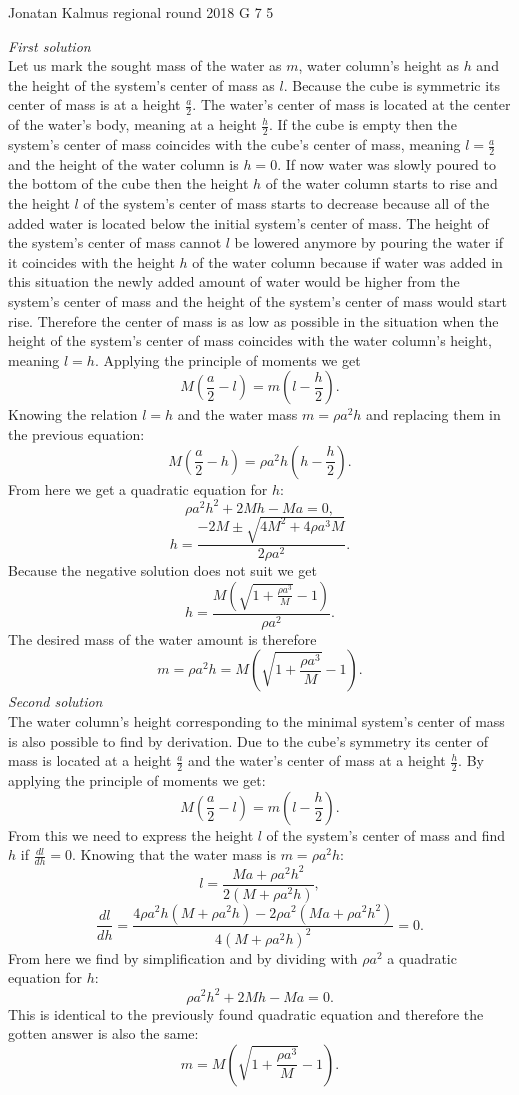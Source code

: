 \documentclass[11pt]{article}
\begin{document}
{Jonatan Kalmus} %
{regional round} %
{2018} %
{G 7} %
{5} %
{

\ifEngSolution
\emph{First solution}\\
Let us mark the sought mass of the water as $m$, water column’s height as $h$ and the height of the system’s center of mass as $l$. Because the cube is symmetric its center of mass is at a height $\frac{a}{2}$. The water’s center of mass is located at the center of the water’s body, meaning at a height $\frac{h}{2}$. If the cube is empty then the system’s center of mass coincides with the cube’s center of mass, meaning $l=\frac{a}{2}$ and the height of the water column is $h=0$. If now water was slowly poured to the bottom of the cube then the height $h$ of the water column starts to rise and the height $l$ of the system’s center of mass starts to decrease because all of the added water is located below the initial system’s center of mass. The height of the system’s center of mass cannot $l$ be lowered anymore by pouring the water if it coincides with the height $h$ of the water column because if water was added in this situation the newly added amount of water would be higher from the system’s center of mass and the height of the system’s center of mass would start rise. Therefore the center of mass is as low as possible in the situation when the height of the system’s center of mass coincides with the water column’s height, meaning $l=h$. Applying the principle of moments we get
$$M(\frac{a}{2}-l)=m(l-\frac{h}{2}).$$
Knowing the relation $l=h$ and the water mass $m=\rho a^2h$ and replacing them in the previous equation:
$$M(\frac{a}{2}-h)=\rho a^2h(h-\frac{h}{2}).$$
From here we get a quadratic equation for $h$:
$$\rho a^2h^2+2Mh-Ma=0,$$
$$h=\frac{-2M \pm \sqrt{4M^2+4\rho a^3M}}{2\rho a^2}.$$
Because the negative solution does not suit we get
$$h=\frac{M(\sqrt{1+\frac{\rho a^3}{M}}-1)}{\rho a^2}.$$
The desired mass of the water amount is therefore
$$m=\rho a^2h=M(\sqrt{1+\frac{\rho a^3}{M}}-1).$$
\emph{Second solution}\\
The water column’s height corresponding to the minimal system’s center of mass is also possible to find by derivation. Due to the cube’s symmetry its center of mass is located at a height $\frac{a}{2}$ and the water’s center of mass at a height $\frac{h}{2}$. By applying the principle of moments we get:
$$M(\frac{a}{2}-l)=m(l-\frac{h}{2}).$$
From this we need to express the height $l$ of the system’s center of mass and find $h$ if $\frac{dl}{dh}=0$. Knowing that the water mass is $m=\rho a^2h$:
$$l=\frac{Ma+\rho a^2h^2}{2(M+\rho a^2h)},$$
$$\frac{dl}{dh}=\frac{4\rho a^2h(M+\rho a^2h)-2\rho a^2(Ma+\rho a^2h^2)}{4(M+\rho a^2h)^2}=0.$$
From here we find by simplification and by dividing with $\rho a^2$ a quadratic equation for $h$:
$$\rho a^2h^2+2Mh-Ma=0.$$
This is identical to the previously found quadratic equation and therefore the gotten answer is also the same:
$$m=M(\sqrt{1+\frac{\rho a^3}{M}}-1).$$
\fi
}
\end{document}
